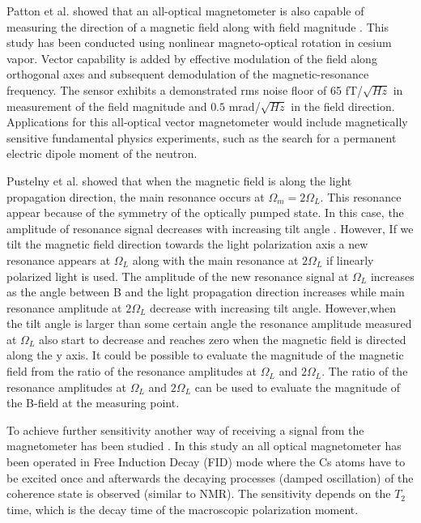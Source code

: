Patton et al. \cite{bib:vectormagnetometer} showed that an all-optical magnetometer is also capable of measuring the direction of a magnetic field along with field magnitude .  This study has been conducted using nonlinear magneto-optical rotation in cesium vapor.  Vector capability is added by effective modulation of the field along orthogonal axes and subsequent demodulation of the magnetic-resonance frequency.  The sensor exhibits a demonstrated rms noise floor of   65 fT/$\sqrt {Hz}$ in measurement of the field magnitude and $ 0.5$  mrad/$\sqrt {Hz}$ in the field direction.  Applications for this all-optical vector magnetometer would include magnetically sensitive fundamental physics experiments, such as the search for a permanent electric dipole moment of the neutron. 

Pustelny et al. \cite{PhysRevA.74.063420}  showed that when the magnetic field is along the light propagation direction, the main resonance occurs at $\Omega_m = 2\Omega_L$. This resonance appear because of the symmetry of the optically pumped state.  In this case, the amplitude of resonance signal decreases with increasing tilt angle . However, If we tilt the magnetic field direction towards the light polarization axis a new resonance appears at $\Omega_L$ along with the main resonance at $2\Omega_L$ if linearly polarized light is used. The amplitude of the new resonance signal at $\Omega_L$  increases as the angle between B and the light propagation direction increases while main resonance amplitude at $2\Omega_L$  decrease with increasing tilt angle. However,when the tilt angle is larger than some certain angle the resonance amplitude measured at $\Omega_L$ also start to decrease and reaches zero when the magnetic field is directed along the y axis.   It could be possible to evaluate the magnitude of the magnetic field from the ratio of the resonance amplitudes at $\Omega_L$ and $2\Omega_L$. The ratio of the resonance amplitudes at $\Omega_L$ and $2\Omega_L$ can be used to
evaluate the magnitude of the B-field at the measuring point.

 To achieve further sensitivity another way of receiving a signal from the magnetometer
has been studied \cite{mythesis}. In this study an all optical magnetometer has been operated in Free Induction Decay (FID) mode where the Cs atoms have to be excited
once and afterwards the decaying processes (damped oscillation) of the coherence state is
observed (similar to NMR). The sensitivity depends on the $T_2$ time, which is the decay time
of the macroscopic polarization moment.

